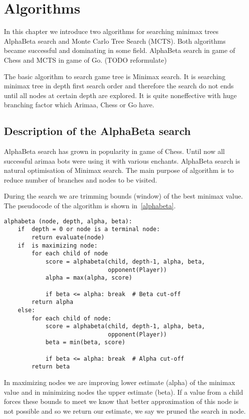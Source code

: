 \chapter{Algorithms}
In this chapter we introduce two algorithms for searching minimax trees
AlphaBeta search and Monte Carlo Tree Search (MCTS). Both algorithms became
successful and dominating in some field. AlphaBeta search in game of Chess and
MCTS in game of Go. (TODO reformulate)

The basic algorithm to search game tree is Minimax search. It is searching
minimax tree in depth first search order and therefore the search do not ends
until all nodes at certain depth are explored. It is quite noneffective with
huge branching factor which Arimaa, Chess or Go have.

\section{Description of the AlphaBeta search}
AlphaBeta search has grown in popularity in game of Chess. Until now all
successful arimaa bots were using it with various enchants. AlphaBeta search is
natural optimisation of Minimax search. The main purpose of algorithm is to
reduce number of branches and nodes to be visited.

During the search we are trimming bounds (window) of the best minimax value.
The pseudocode of the algorithm is shown in~\ref{alphabeta}.

\lstset{language=Python, caption=Pseudocode of the AlphaBeta search, label=alphabeta}
\begin{lstlisting}
alphabeta (node, depth, alpha, beta):
    if  depth = 0 or node is a terminal node:
        return evaluate(node)
    if  is maximizing node:
        for each child of node
            score = alphabeta(child, depth-1, alpha, beta,
                              opponent(Player))
            alpha = max(alpha, score)

            if beta <= alpha: break  # Beta cut-off
        return alpha
    else:
        for each child of node:
            score = alphabeta(child, depth-1, alpha, beta,
                              opponent(Player))
            beta = min(beta, score)

            if beta <= alpha: break  # Alpha cut-off
        return beta
\end{lstlisting}

In maximizing nodes we are improving lower estimate (alpha) of the minimax
value and in minimizing nodes the upper estimate (beta). If a value from a
child forces these bounds to meet we know that better approximation of this
node is not possible and so we return our estimate, we say we pruned the search
in node.

